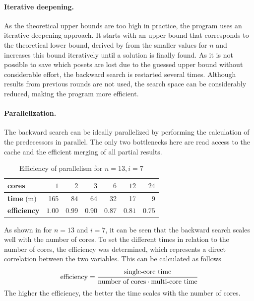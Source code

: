 \documentclass[twoside,leqno,twocolumn]{article}
\begin{document}
\paragraph{Iterative deepening.}
As the theoretical upper bounds are too high in practice, the program uses an iterative deepening approach.
It starts with an upper bound that corresponds to the theoretical lower bound, derived by  from the smaller values for $n$ and increases this bound iteratively until a solution is finally found.
As it is not possible to save which posets are lost due to the guessed upper bound without considerable effort, the backward search is restarted several times.
Although results from previous rounds are not used, the search space can be considerably reduced, making the program more efficient.

\paragraph{Parallelization.} \label{sec:backward:parallelisation}
The backward search can be ideally parallelized by performing the calculation of the predecessors in parallel.
The only two bottlenecks here are read access to the cache and the efficient merging of all partial results.

\begin{table}[!t]
  \renewcommand{\arraystretch}{1.1}
  \caption{Efficiency of parallelism for $n = 13, i = 7$}
  \label{table:backward-parallel}
  \centering
  \small
  \begin{tabular}{l|rrrrrr}
    \textbf{cores}      & $1$    & $2$    & $3$    & $6$    & $12$   & $24$   \\ \hline
    \textbf{time} (m)   & 165    & 84     & 64     & 32     & 17     & 9      \\ \hline
    \textbf{efficiency} & $1.00$ & $0.99$ & $0.90$ & $0.87$ & $0.81$ & $0.75$
  \end{tabular}
\end{table}

As shown in  for $n = 13$ and $i = 7$, it can be seen that the backward search scales well with the number of cores.
To set the different times in relation to the number of cores, the efficiency was determined, which represents a direct correlation between the two variables.
This can be calculated as follows
\[
  \text{efficiency} = \cfrac{\text{single-core time}}{\text{number of cores} \cdot \text{multi-core time}}
\]
The higher the efficiency, the better the time scales with the number of cores.
\end{document}
